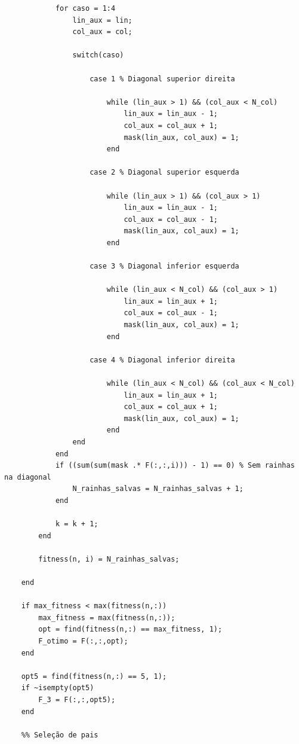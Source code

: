 \documentclass{report}
\begin{document}
\begin{lstlisting}
            for caso = 1:4
                lin_aux = lin;
                col_aux = col;

                switch(caso)
                    
                    case 1 % Diagonal superior direita
                    
                        while (lin_aux > 1) && (col_aux < N_col)
                            lin_aux = lin_aux - 1;
                            col_aux = col_aux + 1;
                            mask(lin_aux, col_aux) = 1;
                        end

                    case 2 % Diagonal superior esquerda
            
                        while (lin_aux > 1) && (col_aux > 1)
                            lin_aux = lin_aux - 1;
                            col_aux = col_aux - 1;
                            mask(lin_aux, col_aux) = 1;
                        end

                    case 3 % Diagonal inferior esquerda

                        while (lin_aux < N_col) && (col_aux > 1)
                            lin_aux = lin_aux + 1;
                            col_aux = col_aux - 1;
                            mask(lin_aux, col_aux) = 1;
                        end
                    
                    case 4 % Diagonal inferior direita

                        while (lin_aux < N_col) && (col_aux < N_col)
                            lin_aux = lin_aux + 1;
                            col_aux = col_aux + 1;
                            mask(lin_aux, col_aux) = 1;
                        end
                end
            end
            if ((sum(sum(mask .* F(:,:,i))) - 1) == 0) % Sem rainhas na diagonal
                N_rainhas_salvas = N_rainhas_salvas + 1;
            end
            
            k = k + 1;
        end

        fitness(n, i) = N_rainhas_salvas;

    end

    if max_fitness < max(fitness(n,:))
        max_fitness = max(fitness(n,:));
        opt = find(fitness(n,:) == max_fitness, 1);
        F_otimo = F(:,:,opt);
    end

    opt5 = find(fitness(n,:) == 5, 1);
    if ~isempty(opt5)
        F_3 = F(:,:,opt5);
    end

    %% Seleção de pais


\end{lstlisting}
\end{document}
